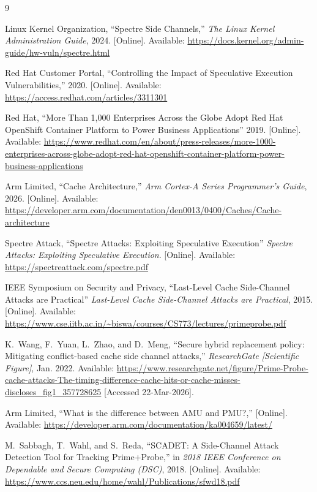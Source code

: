\documentclass[11pt,a4paper, notitlepage]{article}
\begin{document}
\newpage
\begin{thebibliography}{9}

Linux Kernel Organization, 
``Spectre Side Channels,'' 
\emph{The Linux Kernel Administration Guide}, 2024. [Online]. Available: \url{https://docs.kernel.org/admin-guide/hw-vuln/spectre.html}

Red Hat Customer Portal, 
``Controlling the Impact of Speculative Execution Vulnerabilities,'' 
2020. [Online]. Available: \url{https://access.redhat.com/articles/3311301}

Red Hat, 
``More Than 1,000 Enterprises Across the Globe Adopt Red Hat OpenShift Container Platform to Power Business Applications'' 
2019. [Online]. Available: \url{https://www.redhat.com/en/about/press-releases/more-1000-enterprises-across-globe-adopt-red-hat-openshift-container-platform-power-business-applications}

Arm Limited, 
``Cache Architecture,'' 
\emph{Arm Cortex-A Series Programmer's Guide}, 2026. [Online]. Available: \url{https://developer.arm.com/documentation/den0013/0400/Caches/Cache-architecture}

Spectre Attack, 
``Spectre Attacks: Exploiting Speculative Execution'' 
\emph{Spectre Attacks: Exploiting Speculative Execution}. [Online]. Available: \url{https://spectreattack.com/spectre.pdf}

IEEE Symposium on Security and Privacy, 
``Last-Level Cache Side-Channel Attacks are Practical'' 
\emph{Last-Level Cache Side-Channel Attacks are Practical}, 2015. [Online]. Available: \url{https://www.cse.iitb.ac.in/~biswa/courses/CS773/lectures/primeprobe.pdf}

K.~Wang, F.~Yuan, L.~Zhao, and D.~Meng, 
``Secure hybrid replacement policy: Mitigating conflict-based cache side channel attacks,'' 
\textit{ResearchGate [Scientific Figure]}, Jan. 2022. 
Available: \url{https://www.researchgate.net/figure/Prime-Probe-cache-attacks-The-timing-difference-cache-hits-or-cache-misses-discloses_fig1_357728625} [Accessed 22-Mar-2026].

Arm Limited, 
``What is the difference between AMU and PMU?,'' 
[Online]. Available: \url{https://developer.arm.com/documentation/ka004659/latest/}

M.~Sabbagh, T.~Wahl, and S.~Reda, 
``SCADET: A Side-Channel Attack Detection Tool for Tracking Prime+Probe,'' 
in \emph{2018 IEEE Conference on Dependable and Secure Computing (DSC)}, 
2018. [Online]. Available: \url{https://www.ccs.neu.edu/home/wahl/Publications/sfwd18.pdf} 


\end{thebibliography}
\end{document}
